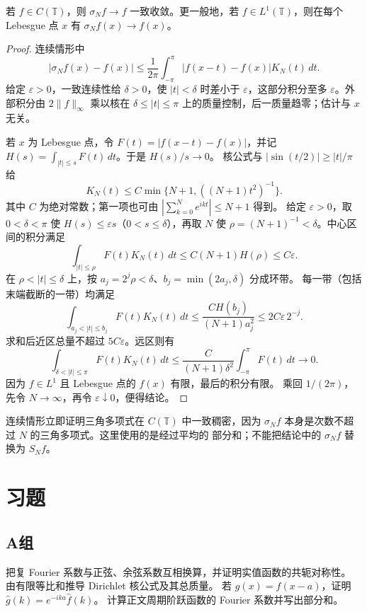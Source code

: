 \begin{theorem}[Fejér 定理]\label{thm:fejer-uniform}
若 \(f\in C(\mathbb T)\)，则 \(\sigma_Nf\to f\) 一致收敛。更一般地，若
\(f\in L^1(\mathbb T)\)，则在每个 Lebesgue 点 \(x\) 有
\(\sigma_Nf(x)\to f(x)\)。
\end{theorem}
\begin{proof}
连续情形中
\[
 |\sigma_Nf(x)-f(x)|
 \le\frac1{2\pi}\int_{-\pi}^{\pi}|f(x-t)-f(x)|K_N(t)\,dt.
\]
给定 \(\varepsilon>0\)，一致连续性给 \(\delta>0\)，使
\(|t|<\delta\) 时差小于 \(\varepsilon\)，这部分积分至多
\(\varepsilon\)。外部积分由 \(2\|f\|_\infty\) 乘以核在
\(\delta\le|t|\le\pi\) 上的质量控制，后一质量趋零；估计与 \(x\) 无关。

若 \(x\) 为 Lebesgue 点，令 \(F(t)=|f(x-t)-f(x)|\)，并记
\(H(s)=\int_{|t|\le s}F(t)\,dt\)。于是 \(H(s)/s\to0\)。
核公式与 \(|\sin(t/2)|\ge |t|/\pi\) 给
\[
 K_N(t)\le C\min\{N+1,((N+1)t^2)^{-1}\}.
\]
其中 \(C\) 为绝对常数；第一项也可由
\(|\sum_{k=0}^Ne^{ikt}|\le N+1\) 得到。
给定 \(\varepsilon>0\)，取 \(0<\delta<\pi\) 使
\(H(s)\le\varepsilon s\)（\(0<s\le\delta\)），再取 \(N\) 使
\(\rho=(N+1)^{-1}<\delta\)。中心区间的积分满足
\[
 \int_{|t|\le\rho}F(t)K_N(t)\,dt
 \le C(N+1)H(\rho)\le C\varepsilon.
\]
在 \(\rho<|t|\le\delta\) 上，按
\(a_j=2^j\rho<\delta\)、\(b_j=\min(2a_j,\delta)\) 分成环带。
每一带（包括末端截断的一带）均满足
\[
 \int_{a_j<|t|\le b_j}F(t)K_N(t)\,dt
 \le\frac{C H(b_j)}{(N+1)a_j^2}
 \le 2C\varepsilon\,2^{-j}.
\]
求和后近区总量不超过 \(5C\varepsilon\)。远区则有
\[
 \int_{\delta<|t|\le\pi}F(t)K_N(t)\,dt
 \le\frac{C}{(N+1)\delta^2}\int_{-\pi}^{\pi}F(t)\,dt\longrightarrow0.
\]
因为 \(f\in L^1\) 且 Lebesgue 点的 \(f(x)\) 有限，最后的积分有限。
乘回 \(1/(2\pi)\)，先令 \(N\to\infty\)，再令
\(\varepsilon\downarrow0\)，便得结论。
\end{proof}

连续情形立即证明三角多项式在 \(C(\mathbb T)\) 中一致稠密，因为
\(\sigma_Nf\) 本身是次数不超过 \(N\) 的三角多项式。这里使用的是经过平均的
部分和；不能把结论中的 \(\sigma_Nf\) 替换为 \(S_Nf\)。

\section*{习题}
\subsection*{A组}
\begin{enumerate}[label=\textbf{\thechapter.\arabic*.}]
把复 Fourier 系数与正弦、余弦系数互相换算，并证明实值函数的共轭对称性。
由有限等比和推导 Dirichlet 核公式及其总质量。
若 \(g(x)=f(x-a)\)，证明 \(\widehat g(k)=e^{-ika}\widehat f(k)\)。
计算正文周期阶跃函数的 Fourier 系数并写出部分和。
\end{enumerate}

